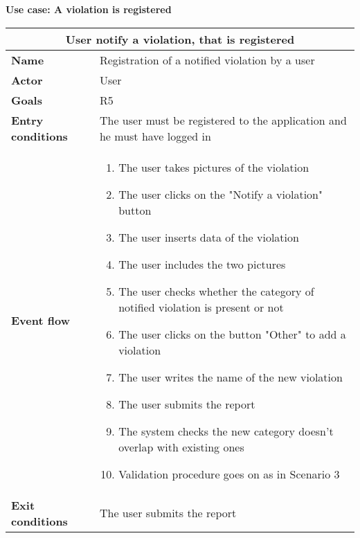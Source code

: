 \begin{description}
    \item \textbf{Use case: A violation is registered}
    \begin{center}
        \begin{tabular}{|p{3cm}|p{7cm}|}
            \multicolumn{2}{c}{\textbf{User notify a violation, that is registered}} \\
            \hline
            \textbf{Name} & Registration of a notified violation by a user \\
            \hline
            \textbf{Actor} & User \\
            \hline
            \textbf{Goals} & R5 \\
            \hline
            \textbf{Entry conditions} & The user must be registered to the application and he must have logged in \\
            \hline
            \textbf{Event flow} &
            \begin{enumerate}
                 \item The user takes pictures of the violation
                \item The user clicks on the "Notify a violation" button
                \item The user inserts data of the violation
                \item The user includes the two pictures 
                \item The user checks whether the category of notified violation is present or not
                \item The user clicks on the button "Other" to add a violation 
                \item The user writes the name of the new violation 
                \item The user submits the report
                \item The system checks the new category doesn't overlap with existing ones 
                \item Validation procedure goes on as in Scenario 3
            \end{enumerate} \\
            \hline
            \textbf{Exit conditions} & The user submits the report \\
            \hline
        \end{tabular}
    \end{center}
\end{description}

